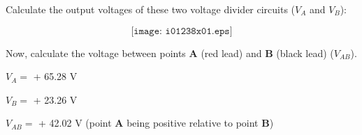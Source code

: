 

Calculate the output voltages of these two voltage divider circuits ($V_A$ and $V_B$):

$$\texttt{[image: i01238x01.eps]}$$

Now, calculate the voltage between points {\bf A} (red lead) and {\bf B} (black lead) ($V_{AB}$).







$V_A =$ + 65.28 V

\vskip 10pt

$V_B =$ + 23.26 V

\vskip 10pt

$V_{AB} =$ + 42.02 V (point {\bf A} being positive relative to point {\bf B})











